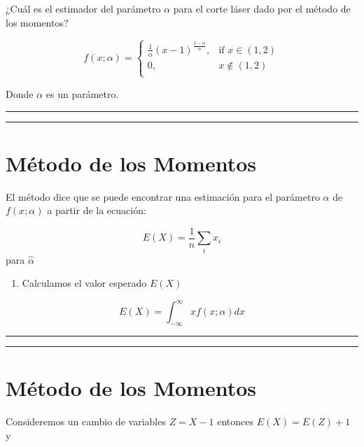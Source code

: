\documentclass[
]{book}
\providecommand{\tightlist}{%
  \setlength{\itemsep}{0pt}\setlength{\parskip}{0pt}}
\begin{document}
¿Cuál es el estimador del parámetro \(\alpha\) para el corte láser dado por el método de los momentos?

\[
    f(x; \alpha)= 
\begin{cases}
\frac{1}{\alpha}(x-1)^{\frac{1-\alpha}{\alpha}},& \text{if } x \in (1,2)\\
    0,& x \notin (1,2)\\
\end{cases}
\]

Donde \(\alpha\) es un parámetro.

\begin{center}\rule{0.5\linewidth}{0.5pt}\end{center}

\begin{center}\rule{0.5\linewidth}{0.5pt}\end{center}

\hypertarget{muxe9todo-de-los-momentos-8}{%
\section{Método de los Momentos}\label{muxe9todo-de-los-momentos-8}}

El método dice que se puede encontrar una estimación para el parámetro \(\alpha\) de \(f(x;\alpha)\) a partir de la ecuación:

\[E(X)=\frac{1}{n}\sum_i x_i\]
para \(\hat{\alpha}\)

\begin{enumerate}
\def\labelenumi{\arabic{enumi}.}
\tightlist
\item
  Calculamos el valor esperado \(E(X)\)
\end{enumerate}

\[E(X)=\int_{-\infty}^{\infty} x f(x;\alpha)dx\]

\begin{center}\rule{0.5\linewidth}{0.5pt}\end{center}

\begin{center}\rule{0.5\linewidth}{0.5pt}\end{center}

\hypertarget{muxe9todo-de-los-momentos-9}{%
\section{Método de los Momentos}\label{muxe9todo-de-los-momentos-9}}

Consideremos un cambio de variables \(Z=X-1\) entonces \(E(X)=E(Z)+1\) y
\end{document}
